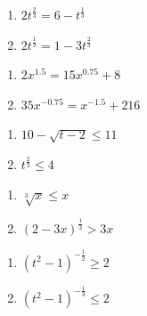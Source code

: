 \begin{multicols}{2}
\begin{enumerate}
\setcounter{enumi}{\value{HW}}

\item  $2t^{\frac{2}{3}} = 6 - t^{\frac{1}{3}}$  %
\item  $2t^{\frac{1}{3}} = 1-3t^{\frac{2}{3}} $  %

\setcounter{HW}{\value{enumi}}
\end{enumerate}
\end{multicols}

\begin{multicols}{2}
\begin{enumerate}
\setcounter{enumi}{\value{HW}}

\item $2x^{1.5} = 15x^{0.75} + 8$  %

\item  $35x^{-0.75} = x^{-1.5} +216$ %

\setcounter{HW}{\value{enumi}}
\end{enumerate}
\end{multicols}

\begin{multicols}{2}
\begin{enumerate}
\setcounter{enumi}{\value{HW}}


\item  $10-\sqrt{t-2} \leq 11$ 
\item  $t^{\frac{2}{3}} \leq 4$ %

\setcounter{HW}{\value{enumi}}
\end{enumerate}
\end{multicols}

\begin{multicols}{2}
\begin{enumerate}
\setcounter{enumi}{\value{HW}}


\item  $\sqrt[3]{x} \leq x$   
\item  $(2-3x)^{\frac{1}{3}} > 3x$  %

\setcounter{HW}{\value{enumi}}
\end{enumerate}
\end{multicols}

\begin{multicols}{2}
\begin{enumerate}
\setcounter{enumi}{\value{HW}}


\item  $(t^2-1)^{-\frac{1}{2}} \geq 2$  %
\item   $(t^2-1)^{-\frac{1}{3}} \leq 2$  %

\setcounter{HW}{\value{enumi}}
\end{enumerate}
\end{multicols}

